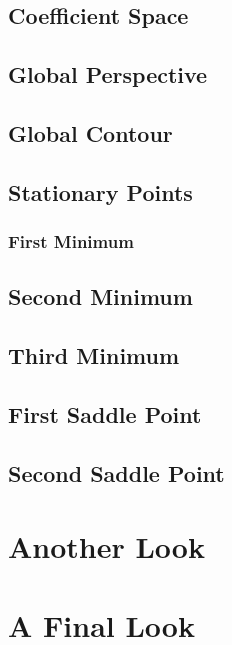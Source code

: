 \documentclass[
  12pt,
]{book}
\begin{document}
\subsection{Coefficient Space}\label{coefficient-space}

\subsection{Global Perspective}\label{global-perspective}

\subsection{Global Contour}\label{global-contour}

\subsection{Stationary Points}\label{stationary-points}

\subsubsection{First Minimum}\label{first-minimum}

\subsection{Second Minimum}\label{second-minimum}

\subsection{Third Minimum}\label{third-minimum}

\subsection{First Saddle Point}\label{first-saddle-point}

\subsection{Second Saddle Point}\label{second-saddle-point}

\section{Another Look}\label{picsphere}

\section{A Final Look}\label{picline}
\end{document}
